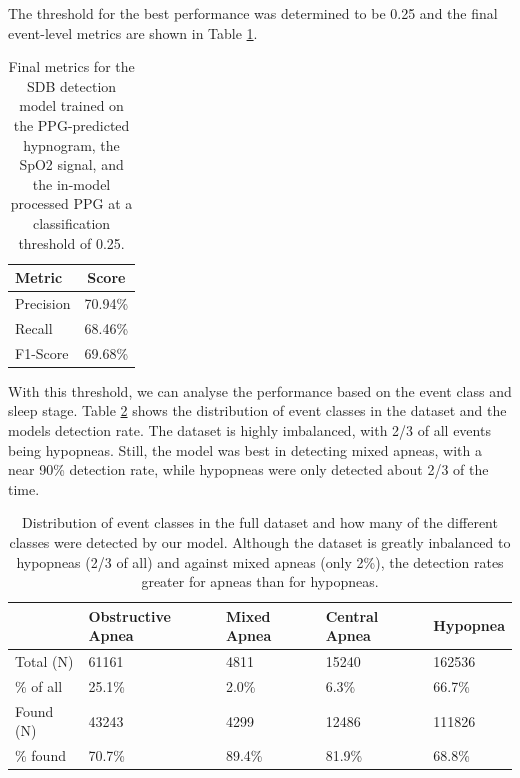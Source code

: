 The threshold for the best performance was determined to be 0.25 and the final event-level metrics are shown in Table \ref{tab:final-metrics}.

\renewcommand{\arraystretch}{1.5}
\begin{table}
    \centering
    \begin{tabular}{ l c }
        Metric & Score \\
        \hline
        Precision & 70.94\% \\
        Recall    & 68.46\% \\
        F1-Score  & 69.68\% \\
    \end{tabular}
    \caption{Final metrics for the SDB detection model trained on the PPG-predicted hypnogram, the SpO2 signal, and the in-model processed PPG at a classification threshold of 0.25. \label{tab:final-metrics}}
\end{table}

With this threshold, we can analyse the performance based on the event class and sleep stage. Table \ref{tab:event-class-distribution} shows the distribution of event classes in the dataset and the models detection rate. The dataset is highly imbalanced, with 2/3 of all events being hypopneas. Still, the model was best in detecting mixed apneas, with a near 90\% detection rate, while hypopneas were only detected about 2/3 of the time.

\renewcommand{\arraystretch}{1.5}
\begin{table}
    \centering
    \begin{tabular}{ l p{2cm} p{2cm} p{2cm} p{2cm} }
        & Obstructive \newline Apnea & Mixed \newline Apnea & Central \newline Apnea & Hypopnea \\
        \hline
        Total (N) & 61161 & 4811 & 15240 & 162536 \\
        \% of all & 25.1\% & 2.0\% & 6.3\%  &  66.7\% \\
        \hline
        Found (N) & 43243 & 4299 & 12486 & 111826 \\
        \% found & 70.7\% & 89.4\% & 81.9\% & 68.8\% \\
    \end{tabular}
    \caption{Distribution of event classes in the full dataset and how many of the different classes were detected by our model. Although the dataset is greatly inbalanced to hypopneas (2/3 of all) and against mixed apneas (only 2\%), the detection rates greater for apneas than for hypopneas. \label{tab:event-class-distribution}}
\end{table}

